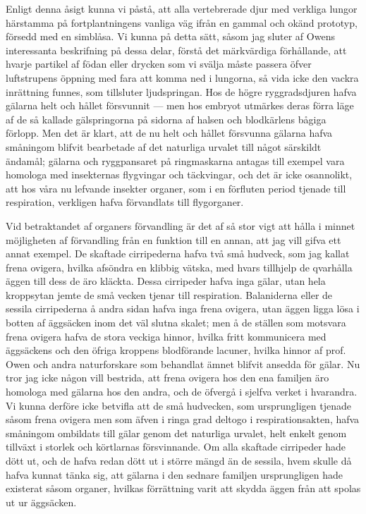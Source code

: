 Enligt denna åsigt kunna vi påstå, att alla vertebrerade djur med verkliga lungor härstamma på fortplantningens vanliga väg ifrån en gammal och okänd prototyp, försedd med en simblåsa. Vi kunna på detta sätt, såsom jag sluter af Owens interessanta beskrifning på dessa delar, förstå det märkvärdiga förhållande, att hvarje partikel af födan eller drycken som vi svälja måste passera öfver luftstrupens öppning med fara att komma ned i lungorna, så vida icke den vackra inrättning funnes, som tillsluter ljudspringan. Hos de högre ryggradsdjuren hafva gälarna helt och hållet försvunnit — men hos embryot utmärkes deras förra läge af de så kallade gälspringorna på sidorna af halsen och blodkärlens bågiga förlopp. Men det är klart, att de nu helt och hållet försvunna gälarna hafva småningom blifvit bearbetade af det naturliga urvalet till något särskildt ändamål; gälarna och ryggpansaret på ringmaskarna antagas till exempel vara homologa med insekternas flygvingar och täckvingar, och det är icke osannolikt, att hos våra nu lefvande insekter organer, som i en förfluten period tjenade till respiration, verkligen hafva förvandlats till flygorganer.

Vid betraktandet af organers förvandling är det af så stor vigt att hålla i minnet möjligheten af förvandling från en funktion till en annan, att jag vill gifva ett annat exempel. De skaftade cirripederna hafva två små hudveck, som jag kallat frena ovigera, hvilka afsöndra en klibbig vätska, med hvars tillhjelp de qvarhålla äggen till dess de äro kläckta. Dessa cirripeder hafva inga gälar, utan hela kroppsytan jemte de små vecken tjenar till respiration. Balaniderna eller de sessila cirripederna å andra sidan hafva inga frena ovigera, utan äggen ligga lösa i botten af äggsäcken inom det väl slutna skalet; men å de ställen som motsvara frena ovigera hafva de stora veckiga hinnor, hvilka fritt kommunicera med äggsäckens och den öfriga kroppens blodförande lacuner, hvilka hinnor af prof. Owen och andra naturforskare som behandlat ämnet blifvit ansedda för gälar. Nu tror jag icke någon vill bestrida, att frena ovigera hos den ena familjen äro homologa med gälarna hos den andra, och de öfvergå i sjelfva verket i hvarandra. Vi kunna derföre icke betvifla att de små hudvecken, som ursprungligen tjenade såsom frena ovigera men som äfven i ringa grad deltogo i respirationsakten, hafva småningom ombildats till gälar genom det naturliga urvalet, helt enkelt genom tillväxt i storlek och körtlarnas försvinnande. Om alla skaftade cirripeder hade dött ut, och de hafva redan dött ut i större mängd än de sessila, hvem skulle då hafva kunnat tänka sig, att gälarna i den sednare familjen ursprungligen hade existerat såsom organer, hvilkas förrättning varit att skydda äggen från att spolas ut ur äggsäcken.



